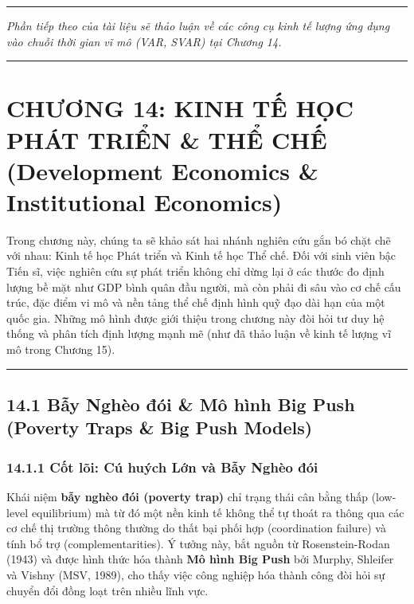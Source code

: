 \documentclass[
]{article}
\begin{document}
\begin{center}\rule{0.5\linewidth}{0.5pt}\end{center}

\emph{Phần tiếp theo của tài liệu sẽ thảo luận về các công cụ kinh tế
lượng ứng dụng vào chuỗi thời gian vĩ mô (VAR, SVAR) tại Chương 14.}

\begin{center}\rule{0.5\linewidth}{0.5pt}\end{center}

\section{CHƯƠNG 14: KINH TẾ HỌC PHÁT TRIỂN \& THỂ CHẾ (Development
Economics \& Institutional
Economics)}\label{chux1b0ux1a1ng-14-kinh-tux1ebf-hux1ecdc-phuxe1t-triux1ec3n-thux1ec3-chux1ebf-development-economics-institutional-economics}

Trong chương này, chúng ta sẽ khảo sát hai nhánh nghiên cứu gắn bó chặt
chẽ với nhau: Kinh tế học Phát triển và Kinh tế học Thể chế. Đối với
sinh viên bậc Tiến sĩ, việc nghiên cứu sự phát triển không chỉ dừng lại
ở các thước đo định lượng bề mặt như GDP bình quân đầu người, mà còn
phải đi sâu vào cơ chế cấu trúc, đặc điểm vi mô và nền tảng thể chế định
hình quỹ đạo dài hạn của một quốc gia. Những mô hình được giới thiệu
trong chương này đòi hỏi tư duy hệ thống và phân tích định lượng mạnh mẽ
(như đã thảo luận về kinh tế lượng vĩ mô trong Chương 15).

\begin{center}\rule{0.5\linewidth}{0.5pt}\end{center}

\subsection{14.1 Bẫy Nghèo đói \& Mô hình Big Push (Poverty Traps \& Big
Push
Models)}\label{bux1eaby-nghuxe8o-ux111uxf3i-muxf4-huxecnh-big-push-poverty-traps-big-push-models}

\subsubsection{14.1.1 Cốt lõi: Cú huých Lớn và Bẫy Nghèo
đói}\label{cux1ed1t-luxf5i-cuxfa-huuxfdch-lux1edbn-vuxe0-bux1eaby-nghuxe8o-ux111uxf3i}

Khái niệm \textbf{bẫy nghèo đói (poverty trap)} chỉ trạng thái cân bằng
thấp (low-level equilibrium) mà từ đó một nền kinh tế không thể tự thoát
ra thông qua các cơ chế thị trường thông thường do thất bại phối hợp
(coordination failure) và tính bổ trợ (complementarities). Ý tưởng này,
bắt nguồn từ Rosenstein-Rodan (1943) và được hình thức hóa thành
\textbf{Mô hình Big Push} bởi Murphy, Shleifer và Vishny (MSV, 1989),
cho thấy việc công nghiệp hóa thành công đòi hỏi sự chuyển đổi đồng loạt
trên nhiều lĩnh vực.
\end{document}
